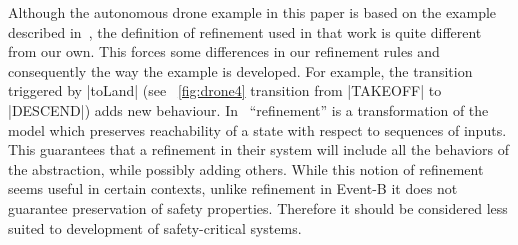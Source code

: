 Although the autonomous drone example in this paper is based on the
example described in~\cite{Syriani_2019}, the definition of refinement
used in that work is quite different from our own. This forces some
differences in our refinement rules and consequently the way the
example is developed. For example, the transition triggered by |toLand| 
(see ~\ref{fig:drone4} transition from |TAKEOFF| to |DESCEND|) 
adds new behaviour.
In~\cite{Syriani_2019} ``refinement'' is a
transformation of the model which preserves reachability of a state
with respect to sequences of inputs. This guarantees that a refinement
in their system will include all the behaviors of the abstraction,
while possibly adding others. While this notion of refinement seems
useful in certain contexts, unlike refinement in Event-B it does not
guarantee preservation of safety properties. Therefore it should be
considered less suited to development of safety-critical systems.

